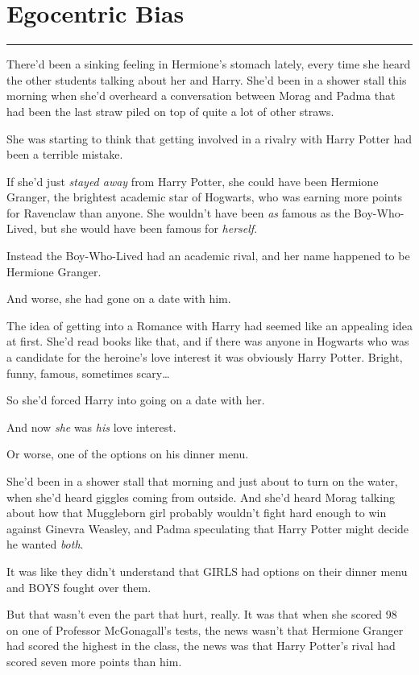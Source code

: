 \chapter{Egocentric Bias}

\begin{center}\rule{3in}{0.4pt}\end{center}

There'd been a sinking feeling in Hermione's stomach lately, every time
she heard the other students talking about her and Harry. She'd been in
a shower stall this morning when she'd overheard a conversation between
Morag and Padma that had been the last straw piled on top of quite a lot
of other straws.

She was starting to think that getting involved in a rivalry with Harry
Potter had been a terrible mistake.

If she'd just \emph{stayed away} from Harry Potter, she could have been
Hermione Granger, the brightest academic star of Hogwarts, who was
earning more points for Ravenclaw than anyone. She wouldn't have been
\emph{as} famous as the Boy-Who-Lived, but she would have been famous
for \emph{herself}.

Instead the Boy-Who-Lived had an academic rival, and her name happened
to be Hermione Granger.

And worse, she had gone on a date with him.

The idea of getting into a Romance with Harry had seemed like an
appealing idea at first. She'd read books like that, and if there was
anyone in Hogwarts who was a candidate for the heroine's love interest
it was obviously Harry Potter. Bright, funny, famous, sometimes
scary\ldots{}

So she'd forced Harry into going on a date with her.

And now \emph{she} was \emph{his} love interest.

Or worse, one of the options on his dinner menu.

She'd been in a shower stall that morning and just about to turn on the
water, when she'd heard giggles coming from outside. And she'd heard
Morag talking about how that Muggleborn girl probably wouldn't fight
hard enough to win against Ginevra Weasley, and Padma speculating that
Harry Potter might decide he wanted \emph{both}.

It was like they didn't understand that GIRLS had options on their
dinner menu and BOYS fought over them.

But that wasn't even the part that hurt, really. It was that when she
scored 98 on one of Professor McGonagall's tests, the news wasn't that
Hermione Granger had scored the highest in the class, the news was that
Harry Potter's rival had scored seven more points than him.

